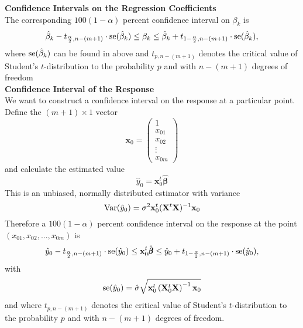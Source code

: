 \textbf{Confidence Intervals on the Regression Coefficients}\\
The corresponding $100(1 - \alpha)$ percent confidence interval on $\beta_k$ is
\begin{equation}
  \hat{\beta}_k - t_{\frac{\alpha}{2},n-(m+1)} \cdot \textup{se}(\hat{\beta}_k)
  \leq \beta_k \leq
  \hat{\beta}_k + t_{1-{\frac{\alpha}{2},n-(m+1)}} \cdot \textup{se}(\hat{\beta}_k),
\end{equation}
where $\textup{se}(\hat{\beta}_k)$ can be found in above and $t_{p,n-(m+1)}$ denotes the critical value of Student’s $t$-distribution to the probability $p$ and with $n - (m + 1)$ degrees of freedom\\

\textbf{Confidence Interval of the Response}\\
We want to construct a confidence interval on the response at a particular point. Define the $(m+1) \times 1$ vector
\begin{equation}
  \mathbf{x}_0 = \begin{pmatrix} 1 \\ x_{01} \\ x_{02}\\ \vdots \\ x_{0m}\end{pmatrix}
\end{equation}
and calculate the estimated value
\begin{equation}
  \hat{y}_0 = \mathbf{x}^t_0 \hat{\pmb{\beta}}
\end{equation}
This is an unbiased, normally distributed estimator with variance
\begin{equation}
  \textup{Var}(\hat{y}_0) = \sigma^2  \mathbf{x}^t_0 (\mathbf{X}^t \mathbf{X})^{-1}  \mathbf{x}_0
\end{equation}
Therefore a $100(1 - \alpha)$ percent confidence interval on the response at the point $(x_{01}, x_{02}, . . . , x_{0m})$ is
\begin{equation}
  \hat{y}_0 - t_{\frac{\alpha}{2},n-(m+1)} \cdot \textup{se}(\hat{y}_0)
  \leq \mathbf{x}^t_0 \hat{\pmb{\beta}} \leq
  \hat{y}_0 + t_{1-{\frac{\alpha}{2},n-(m+1)}} \cdot \textup{se}(\hat{y}_0),
\end{equation}
with
\begin{equation}
 \textup{se}(\hat{y}_0) = \hat{\sigma}\sqrt{ \mathbf{x}^t_0 \left(\mathbf{X}^t_0\mathbf{X}\right)^{-1} \mathbf{x}_0}
\end{equation}
and where  $t_{p,n-(m+1)}$ denotes the critical value of Student’s $t$-distribution to the probability $p$ and with $n - (m + 1)$ degrees of freedom.\\

